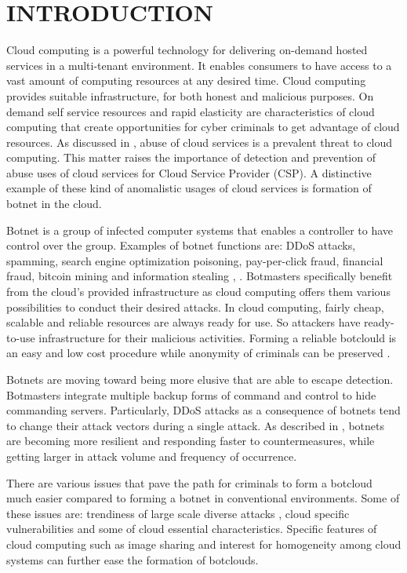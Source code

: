 \documentclass[conference]{IEEEtran}
\begin{document}
\section{INTRODUCTION}
Cloud computing is a powerful technology for delivering on-demand hosted services in a multi-tenant environment. It enables consumers to have access to a vast amount of computing resources at any desired time. Cloud computing provides suitable infrastructure, for both honest and malicious purposes. On demand self service resources and rapid elasticity are characteristics of cloud computing that create opportunities for cyber criminals to get advantage of cloud resources. As discussed in \cite{ref1}, abuse of cloud services is a prevalent threat to cloud computing. This matter raises the importance of detection and prevention of abuse uses of cloud services for Cloud Service Provider (CSP). A distinctive example of these kind of anomalistic usages of cloud services is formation of botnet in the cloud.

Botnet is a group of infected computer systems that enables a controller to have control over the group. Examples of botnet functions are: DDoS attacks, spamming, search engine optimization poisoning, pay-per-click fraud, financial fraud, bitcoin mining and information stealing \cite{ref22}, \cite{ref34}. Botmasters specifically benefit from the cloud's provided infrastructure as cloud computing offers them various possibilities to conduct their desired attacks. In cloud computing, fairly cheap, scalable and reliable resources are always ready for use. So attackers have ready-to-use infrastructure for their malicious activities. Forming a reliable botclould is an easy and low cost procedure while anonymity of criminals can be preserved \cite{ref42}. 

Botnets are moving toward being more elusive that are able to escape detection. Botmasters integrate multiple backup forms of command and control to hide commanding servers. Particularly, DDoS attacks as a consequence of botnets tend to change their attack vectors during a single attack. As described in \cite{ref14}, botnets are becoming more resilient and responding faster to countermeasures, while getting larger in attack volume and frequency of occurrence\cite{ref16}. 

There are various issues that pave the path for criminals to form a botcloud much easier compared to forming a botnet in conventional environments. Some of these issues are: trendiness of large scale diverse attacks \cite{ref36}, cloud specific vulnerabilities \cite{ref9} and some of cloud essential characteristics. Specific features of cloud computing such as image sharing and interest for homogeneity among cloud systems can further ease the formation of botclouds.    
\end{document}

